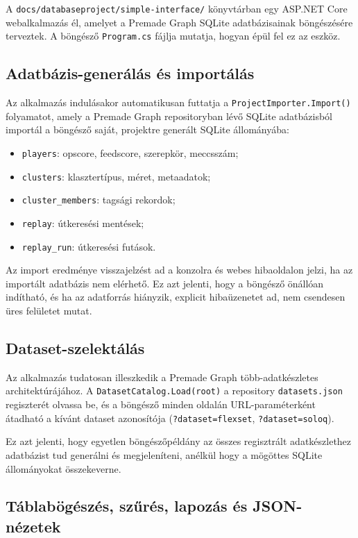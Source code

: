﻿\documentclass[a4paper,12pt]{report}
\begin{document}
A \texttt{docs/databaseproject/simple-interface/} könyvtárban egy ASP.NET Core webalkalmazás él, amelyet a Premade Graph SQLite adatbázisainak böngészésére terveztek. A böngésző \texttt{Program.cs} fájlja mutatja, hogyan épül fel ez az eszköz.

\subsection{Adatbázis-generálás és importálás}

Az alkalmazás indulásakor automatikusan futtatja a \texttt{ProjectImporter.Import()} folyamatot, amely a Premade Graph repositoryban lévő SQLite adatbázisból importál a böngésző saját, projektre generált SQLite állományába:

\begin{itemize}
    \item \texttt{players}: opscore, feedscore, szerepkör, meccsszám;
    \item \texttt{clusters}: klasztertípus, méret, metaadatok;
    \item \texttt{cluster\_members}: tagsági rekordok;
    \item \texttt{replay}: útkeresési mentések;
    \item \texttt{replay\_run}: útkeresési futások.
\end{itemize}

Az import eredménye visszajelzést ad a konzolra és webes hibaoldalon jelzi, ha az importált adatbázis nem elérhető. Ez azt jelenti, hogy a böngésző önállóan indítható, és ha az adatforrás hiányzik, explicit hibaüzenetet ad, nem csendesen üres felületet mutat.

\subsection{Dataset-szelektálás}

Az alkalmazás tudatosan illeszkedik a Premade Graph több-adatkészletes architektúrájához. A \texttt{DatasetCatalog.Load(root)} a repository \texttt{datasets.json} regiszterét olvassa be, és a böngésző minden oldalán URL-paraméterként átadható a kívánt dataset azonosítója (\texttt{?dataset=flexset}, \texttt{?dataset=soloq}).

Ez azt jelenti, hogy egyetlen böngészőpéldány az összes regisztrált adatkészlethez adatbázist tud generálni és megjeleníteni, anélkül hogy a mögöttes SQLite állományokat összekeverne.

\subsection{Táblabögészés, szűrés, lapozás és JSON-nézetek}
\end{document}

